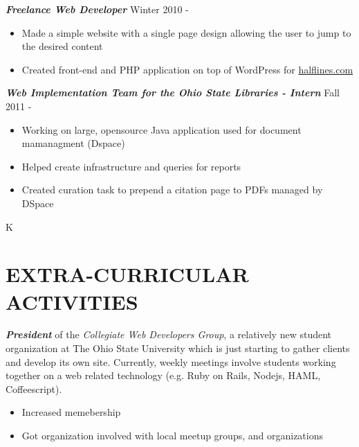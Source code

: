 \documentclass[line,margin=.2,letterpaper]{resume}
\begin{document}
\begin{resume}
	{\sl\textbf{Freelance Web Developer}} \hfill Winter 2010 - \\
	\vspace{-8pt}
	 \begin{itemize}  
         \item Made a simple website with a single page design allowing the user
         to jump to the desired content
         \item Created front-end and PHP application on top of WordPress for
         \href{http://halflines.com/}{halflines.com}
	 \end{itemize} 
    {\sl\textbf{Web Implementation Team for the Ohio State Libraries - Intern}}
    \hfill Fall 2011 - \\
	\vspace{-8pt}
    \begin{itemize}  
        \item Working on large, opensource Java application used for document
        mamanagment (Dspace)
        \item Helped create infrastructure and queries for reports
        \item Created curation task to prepend a citation page to PDFs managed
        by DSpace
    \end{itemize} 
     K
                 
\section{\uppercase{Extra-Curricular Activities}}             
    \emph{\textbf{President}} of the \emph{Collegiate Web Developers Group}, a
    relatively new student organization at The Ohio State University which is
    just starting to gather clients and develop its own site.  Currently, weekly
    meetings involve students working together on a web related technology (e.g.
    Ruby on Rails, Nodejs, HAML, Coffeescript).\\
    \vspace{-8pt}
	\begin{itemize}
	    \item Increased memebership
        \item Got organization involved with local meetup groups, and
        organizations
	\end{itemize}
 
\end{resume}
\end{document}
